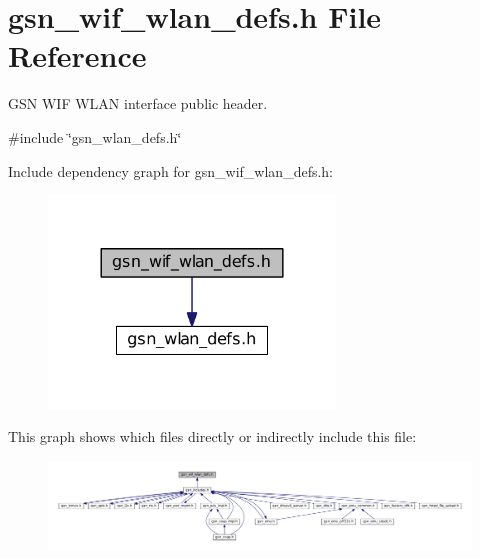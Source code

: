 \hypertarget{a00613}{
\section{gsn\_\-wif\_\-wlan\_\-defs.h File Reference}
\label{a00613}
}


GSN WIF WLAN interface public header.  


{\ttfamily \#include \char`\"{}gsn\_\-wlan\_\-defs.h\char`\"{}}\par
Include dependency graph for gsn\_\-wif\_\-wlan\_\-defs.h:
\nopagebreak
\begin{figure}[H]
\begin{center}
\leavevmode
\includegraphics[width=216pt]{a00860}
\end{center}
\end{figure}
This graph shows which files directly or indirectly include this file:
\nopagebreak
\begin{figure}[H]
\begin{center}
\leavevmode
\includegraphics[width=400pt]{a00861}
\end{center}
\end{figure}
